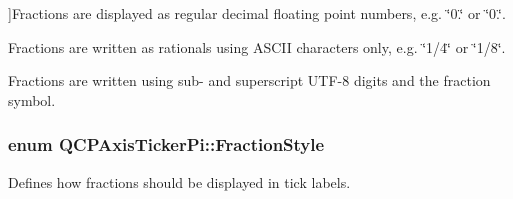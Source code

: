 \begin{Desc}
\begin{description}
{}]Fractions are displayed as regular decimal floating point numbers, e.\+g. \char`\"{}0.\char`\"{} or \char`\"{}0.\char`\"{}. \item[{\em 
fs\+Ascii\+Fractions\hypertarget{class_q_c_p_axis_ticker_pi_a262f1534c7f0c79a7d5237f5d1e2c54ca6fac514410866c5f9cb7917dbe12345a}{}\label{class_q_c_p_axis_ticker_pi_a262f1534c7f0c79a7d5237f5d1e2c54ca6fac514410866c5f9cb7917dbe12345a}
}]Fractions are written as rationals using A\+S\+C\+II characters only, e.\+g. \char`\"{}1/4\char`\"{} or \char`\"{}1/8\char`\"{}. \item[{\em 
fs\+Unicode\+Fractions\hypertarget{class_q_c_p_axis_ticker_pi_a262f1534c7f0c79a7d5237f5d1e2c54cae110eb223e71eb94792ea75eb1748826}{}\label{class_q_c_p_axis_ticker_pi_a262f1534c7f0c79a7d5237f5d1e2c54cae110eb223e71eb94792ea75eb1748826}
}]Fractions are written using sub-\/ and superscript U\+T\+F-\/8 digits and the fraction symbol. \end{description}
\end{Desc}
\subsubsection[{\texorpdfstring{Fraction\+Style}{FractionStyle}}]{\setlength{\rightskip}{0pt plus 5cm}enum {\bf Q\+C\+P\+Axis\+Ticker\+Pi\+::\+Fraction\+Style}}\hypertarget{class_q_c_p_axis_ticker_pi_a262f1534c7f0c79a7d5237f5d1e2c54c}{}\label{class_q_c_p_axis_ticker_pi_a262f1534c7f0c79a7d5237f5d1e2c54c}
Defines how fractions should be displayed in tick labels.

